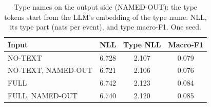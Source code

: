 \begin{table}[t]
\caption{Type names on the output side (NAMED-OUT): the type tokens start from the LLM's embedding of the type name. NLL, its type part (nats per event), and type macro-F1. One seed.}
\label{tab:rq3named}
\footnotesize\setlength{\tabcolsep}{3pt}
\begin{tabular}{@{}lccc@{}}
\toprule
Input & NLL & Type NLL & Macro-F1\\
\midrule
NO-TEXT & 6.728 & 2.107 & 0.079\\
NO-TEXT, NAMED-OUT & 6.721 & 2.106 & 0.076\\
FULL & 6.742 & 2.123 & 0.084\\
FULL, NAMED-OUT & 6.740 & 2.120 & 0.085\\
\bottomrule
\end{tabular}
\end{table}
